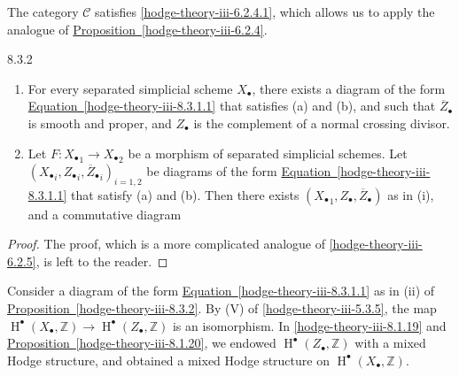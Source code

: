     The category \(\mathscr {C}\) satisfies \cref{hodge-theory-iii-6.2.4.1}, which allows us to apply the analogue of \hyperref[hodge-theory-iii-6.2.4]{Proposition~\ref*{hodge-theory-iii-6.2.4}}.\begin{proposition}{8.3.2}\label{hodge-theory-iii-8.3.2}\skipsinglepar\begin{enumerate}
    
 \item[(i)]
      For every separated simplicial scheme \(X_\bullet \), there exists a diagram of the form \hyperref[hodge-theory-iii-8.3.1.1]{Equation~\ref*{hodge-theory-iii-8.3.1.1}} that satisfies (a) and (b), and such that \(\overline {Z}_\bullet \) is smooth and proper, and \(Z_\bullet \) is the complement of a normal crossing divisor.
    


    
 \item[(ii)]
      Let \(F\colon  {X_\bullet }_1\to {X_\bullet }_2\) be a morphism of separated simplicial schemes.
      Let \(({X_\bullet }_i,{Z_\bullet }_i,{\overline {Z}_\bullet }_i)_{i=1,2}\) be diagrams of the form \hyperref[hodge-theory-iii-8.3.1.1]{Equation~\ref*{hodge-theory-iii-8.3.1.1}} that satisfy (a) and (b).
      Then there exists \(({X_\bullet }_1,Z_\bullet ,\overline {Z}_\bullet )\) as in (i), and a commutative diagram

      

    

  \end{enumerate}\begin{proof}\par{}The proof, which is a more complicated analogue of \cref{hodge-theory-iii-6.2.5}, is left to the reader.\end{proof}\end{proposition}\label{hodge-theory-iii-8.3.3}\par{}Consider a diagram of the form \hyperref[hodge-theory-iii-8.3.1.1]{Equation~\ref*{hodge-theory-iii-8.3.1.1}} as in (ii) of \hyperref[hodge-theory-iii-8.3.2]{Proposition~\ref*{hodge-theory-iii-8.3.2}}.
    By (V) of \cref{hodge-theory-iii-5.3.5}, the map \(\operatorname {H}^\bullet {(X_\bullet ,\mathbb {Z})\to \operatorname {H}^\bullet (Z_\bullet ,\mathbb {Z})}\) is an isomorphism.
    In \cref{hodge-theory-iii-8.1.19} and \hyperref[hodge-theory-iii-8.1.20]{Proposition~\ref*{hodge-theory-iii-8.1.20}}, we endowed \(\operatorname {H}^\bullet (Z_\bullet ,\mathbb {Z})\) with a mixed Hodge structure, and obtained a mixed Hodge structure on \(\operatorname {H}^\bullet (X_\bullet ,\mathbb {Z})\).
    
